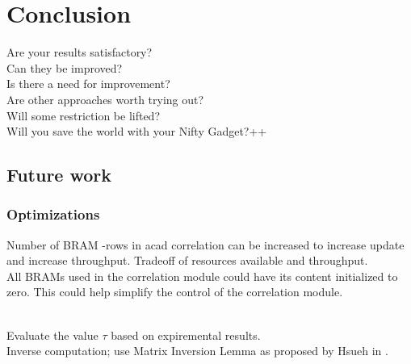 \newpage
\chapter{Conclusion}
\label{sec:conclusion}



Are your results satisfactory?\\
Can they be improved?\\
Is there a need for improvement?\\
Are other approaches worth trying out?\\
Will some restriction be lifted?\\
Will you save the world with your Nifty Gadget?++

\section{Future work}

\subsection{Optimizations}
Number of BRAM -rows in acad correlation can be increased to increase update and increase throughput. Tradeoff of resources available and throughput.
\\

All BRAMs used in the correlation module could have its content initialized to zero. This could help simplify the control of the correlation module.

\\ 
Evaluate the value $\tau$ based on expiremental results.\\

Inverse computation; use Matrix Inversion Lemma as proposed by Hsueh in \cite{hsueh_master_thesis}.